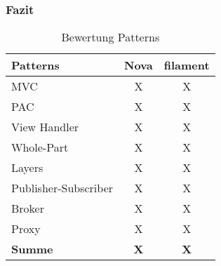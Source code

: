 \subsubsection{Fazit}
\begin{table}[]
    \label{tab:bewertung-patterns}
    \centering
    \begin{tabular}{|l|c|c|}
        \hline
        \textbf{Patterns}    & \textbf{Nova} & \textbf{filament} \\ \hline
        MVC                  & X             & X                 \\ \hline
        PAC                  & X             & X                 \\ \hline
        View Handler         & X             & X                 \\ \hline
        Whole-Part           & X             & X                 \\ \hline
        Layers               & X             & X                 \\ \hline
        Publisher-Subscriber & X             & X                 \\ \hline
        Broker               & X             & X                 \\ \hline
        Proxy                & X             & X                 \\ \hline
        \textbf{Summe}       & \textbf{X}    & \textbf{X}        \\ \hline
    \end{tabular}
    \caption{Bewertung Patterns}
\end{table}

\color{black}
